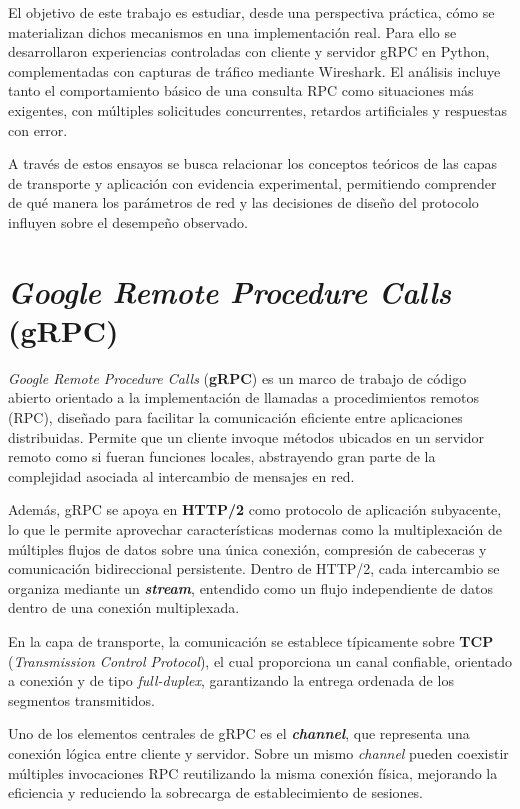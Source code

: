 \documentclass[a4paper,12pt]{article}
\begin{document}
El objetivo de este trabajo es estudiar, desde una perspectiva práctica, cómo se materializan dichos mecanismos en una implementación real. Para ello se desarrollaron experiencias controladas con cliente y servidor gRPC en Python, complementadas con capturas de tráfico mediante Wireshark. El análisis incluye tanto el comportamiento básico de una consulta RPC como situaciones más exigentes, con múltiples solicitudes concurrentes, retardos artificiales y respuestas con error.

A través de estos ensayos se busca relacionar los conceptos teóricos de las capas de transporte y aplicación con evidencia experimental, permitiendo comprender de qué manera los parámetros de red y las decisiones de diseño del protocolo influyen sobre el desempeño observado.

\section{\textit{Google Remote Procedure Calls} (gRPC)}

\textit{Google Remote Procedure Calls} (\textbf{gRPC}) es un marco de trabajo de código abierto orientado a la implementación de llamadas a procedimientos remotos (RPC), diseñado para facilitar la comunicación eficiente entre aplicaciones distribuidas. Permite que un cliente invoque métodos ubicados en un servidor remoto como si fueran funciones locales, abstrayendo gran parte de la complejidad asociada al intercambio de mensajes en red.

Además, gRPC se apoya en \textbf{HTTP/2} como protocolo de aplicación subyacente, lo que le permite aprovechar características modernas como la multiplexación de múltiples flujos de datos sobre una única conexión, compresión de cabeceras y comunicación bidireccional persistente. Dentro de HTTP/2, cada intercambio se organiza mediante un \textbf{\textit{stream}}, entendido como un flujo independiente de datos dentro de una conexión multiplexada.

En la capa de transporte, la comunicación se establece típicamente sobre \textbf{TCP} (\textit{Transmission Control Protocol}), el cual proporciona un canal confiable, orientado a conexión y de tipo \textit{full-duplex}, garantizando la entrega ordenada de los segmentos transmitidos.

Uno de los elementos centrales de gRPC es el \textbf{\textit{channel}}, que representa una conexión lógica entre cliente y servidor. Sobre un mismo \textit{channel} pueden coexistir múltiples invocaciones RPC reutilizando la misma conexión física, mejorando la eficiencia y reduciendo la sobrecarga de establecimiento de sesiones.
\end{document}
